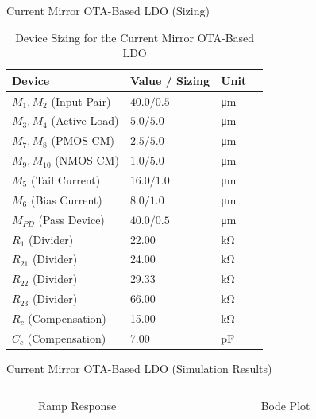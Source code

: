 \documentclass[10pt, aspectratio=169]{beamer}
\newcommand{\svg}[3]{
    \begin{figure}
        \centering
        
        \caption{#2}
    \end{figure}
}
\begin{document}
\begin{frame}{Current Mirror OTA-Based LDO (Sizing)}
    \begin{table}[htbp]
        \scriptsize
        \centering
        \label{tab:sizing_cm}
        \begin{tabular}{@{}lllc@{}}
            \toprule
            \textbf{Device} & \textbf{Value / Sizing} & \textbf{Unit} \\
            \midrule
            $M_1, M_2$ (Input Pair) & $40.0 / 0.5$ & \unit{\micro\meter} \\
            $M_3, M_4$ (Active Load) & $5.0 / 5.0$ & \unit{\micro\meter} \\
            \midrule
            $M_7, M_8$ (PMOS CM) & $2.5 / 5.0$ & \unit{\micro\meter} \\
            $M_9, M_{10}$ (NMOS CM) & $1.0 / 5.0$ & \unit{\micro\meter} \\
            $M_5$ (Tail Current) & $16.0 / 1.0$ & \unit{\micro\meter} \\
            $M_6$ (Bias Current) & $8.0 / 1.0$ & \unit{\micro\meter} \\
            \midrule
            $M_{PD}$ (Pass Device) & $40.0 / 0.5$ & \unit{\micro\meter} \\
            \midrule
            $R_1$ (Divider) & 22.00 & \unit{\kilo\ohm} \\
            $R_{21}$ (Divider) & 24.00 & \unit{\kilo\ohm} \\
            $R_{22}$ (Divider) & 29.33 & \unit{\kilo\ohm} \\
            $R_{23}$ (Divider) & 66.00 & \unit{\kilo\ohm} \\
            $R_c$ (Compensation) & 15.00 & \unit{\kilo\ohm} \\
            $C_c$ (Compensation) & 7.00 & \unit{\pico\farad} \\
            \bottomrule
        \end{tabular}
        \caption{Device Sizing for the Current Mirror OTA-Based LDO}
    \end{table}
\end{frame}

\begin{frame}{Current Mirror OTA-Based LDO (Simulation Results)}
    \begin{columns}[c,onlytextwidth]
        \begin{column}{0.48\textwidth}
            \svg{../simulations/images/cm_tran.svg}{Ramp Response}{1}
        \end{column}
        \begin{column}{0.48\textwidth}
            \svg{../simulations/images/cm_bode.svg}{Bode Plot}{1}
        \end{column}
    \end{columns}
\end{frame}
\end{document}
